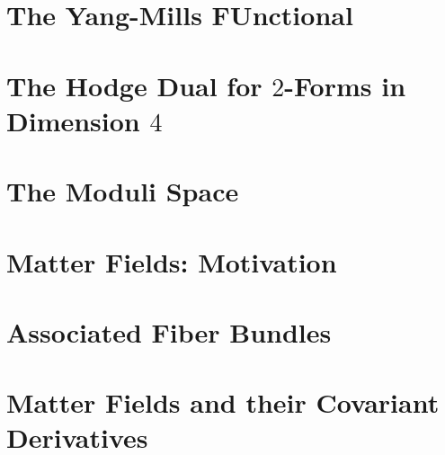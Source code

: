 \section{The Yang-Mills FUnctional}

\section{The Hodge Dual for $2$-Forms in Dimension $4$}

\section{The Moduli Space}

\section{Matter Fields: Motivation}

\section{Associated Fiber Bundles}

\section{Matter Fields and their Covariant Derivatives}